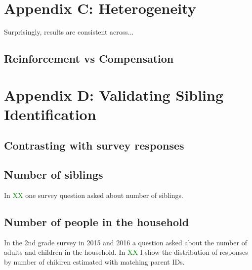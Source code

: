 \clearpage


\setcounter{figure}{0}
\renewcommand\thefigure{C.\arabic{figure}}    

\setcounter{table}{0}
\renewcommand{\thetable}{C.\arabic{table}}
\setcounter{subsection}{0}

\section*{Appendix C: Heterogeneity} \label{sec:appC}

Surprisingly, results are consistent across...

\subsection{Reinforcement vs Compensation}



\clearpage

\setcounter{figure}{0}
\renewcommand\thefigure{D.\arabic{figure}}    

\setcounter{table}{0}
\renewcommand{\thetable}{D.\arabic{table}}
\setcounter{subsection}{0}

\section*{Appendix D: Validating Sibling Identification} \label{sec:appD}

\subsection{Contrasting with survey responses}


\subsection{Number of siblings}

In \textcolor{green}{XX} one survey question asked about number of siblings.


\subsection{Number of people in the household}

In the 2nd grade survey in 2015 and 2016 a question asked about the number of adults and children in the household. In \textcolor{green}{XX} I show the distribution of responses by number of children estimated with matching parent IDs. 

